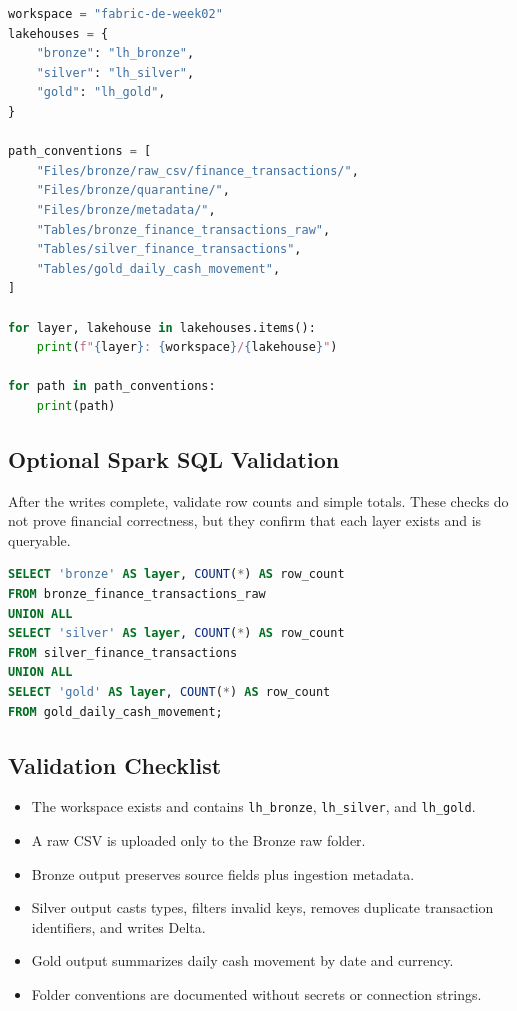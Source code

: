\begin{lstlisting}[language=Python,caption={Folder and OneLake path convention helper for Week 2.},label={lst:chapter2-path-conventions}]
workspace = "fabric-de-week02"
lakehouses = {
    "bronze": "lh_bronze",
    "silver": "lh_silver",
    "gold": "lh_gold",
}

path_conventions = [
    "Files/bronze/raw_csv/finance_transactions/",
    "Files/bronze/quarantine/",
    "Files/bronze/metadata/",
    "Tables/bronze_finance_transactions_raw",
    "Tables/silver_finance_transactions",
    "Tables/gold_daily_cash_movement",
]

for layer, lakehouse in lakehouses.items():
    print(f"{layer}: {workspace}/{lakehouse}")

for path in path_conventions:
    print(path)
\end{lstlisting}

\subsection{Optional Spark SQL Validation}
After the writes complete, validate row counts and simple totals. These checks do not prove financial correctness, but they confirm that each layer exists and is queryable.

\begin{lstlisting}[language=SQL,caption={Spark SQL validation for Week 2 medallion tables.}]
SELECT 'bronze' AS layer, COUNT(*) AS row_count
FROM bronze_finance_transactions_raw
UNION ALL
SELECT 'silver' AS layer, COUNT(*) AS row_count
FROM silver_finance_transactions
UNION ALL
SELECT 'gold' AS layer, COUNT(*) AS row_count
FROM gold_daily_cash_movement;
\end{lstlisting}

\subsection{Validation Checklist}
\begin{itemize}
    \item The workspace exists and contains \texttt{lh\_bronze}, \texttt{lh\_silver}, and \texttt{lh\_gold}.
    \item A raw CSV is uploaded only to the Bronze raw folder.
    \item Bronze output preserves source fields plus ingestion metadata.
    \item Silver output casts types, filters invalid keys, removes duplicate transaction identifiers, and writes Delta.
    \item Gold output summarizes daily cash movement by date and currency.
    \item Folder conventions are documented without secrets or connection strings.
\end{itemize}

